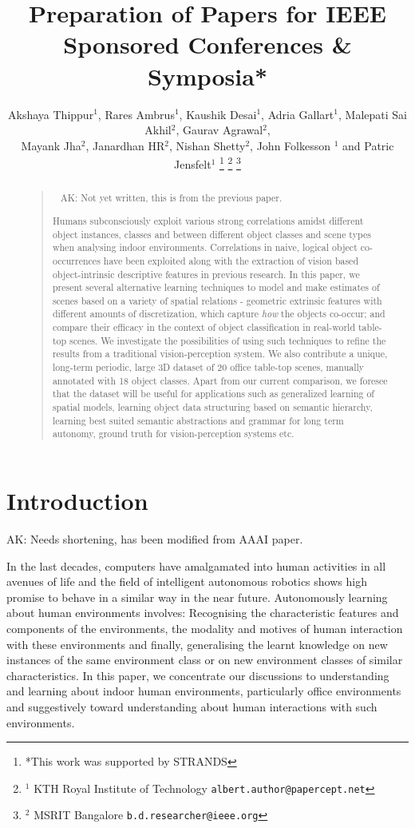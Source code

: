 \documentclass[letterpaper, 10 pt, conference]{ieeeconf}  %
\title{\LARGE \bf
Preparation of Papers for IEEE Sponsored Conferences \& Symposia*
}
\author{Akshaya Thippur$^{1}$, Rares Ambrus$^{1}$, Kaushik Desai$^{1}$, Adria Gallart$^{1}$, Malepati Sai Akhil$^{2}$, Gaurav Agrawal$^{2}$,\\Mayank Jha$^{2}$, Janardhan HR$^{2}$, Nishan Shetty$^{2}$, John Folkesson $^{1}$ and Patric Jensfelt$^{1}$%
\thanks{*This work was supported by STRANDS}%
\thanks{$^{1}$ KTH Royal Institute of Technology
        {\tt\small albert.author@papercept.net}}%
\thanks{$^{2}$ MSRIT Bangalore
        {\tt\small b.d.researcher@ieee.org}}%
}
\begin{document}
\maketitle
\thispagestyle{empty}
\pagestyle{empty}

\begin{abstract}
\begin{quote}\
{\color{blue} AK: Not yet written, this is from the previous paper.}

Humans subconsciously exploit various strong correlations amidst different object instances, classes and between different object classes and scene types when analysing indoor environments. Correlations in naive, logical object co-occurrences have been exploited along with the extraction of vision based object-intrinsic descriptive features in previous research. In this paper, we present several alternative learning techniques to model and make estimates of scenes based on a variety of spatial relations - geometric extrinsic features with different amounts of discretization, which capture \textit{how} the objects co-occur; and compare their efficacy in the context of object classification in real-world table-top scenes. We investigate the possibilities of using such techniques to refine the results from a traditional vision-perception system. We also contribute a unique, long-term periodic, large 3D dataset of 20 office table-top scenes, manually annotated with 18 object classes. Apart from our current comparison, we foresee that the dataset will be useful for applications such as generalized learning of spatial models, learning object data structuring based on semantic hierarchy, learning best suited semantic abstractions and grammar for long term autonomy, ground truth for vision-perception systems etc.

\end{quote}
\end{abstract}


\section{Introduction}
\label{sec:Introduction}

{\color{blue} AK: Needs shortening, has been modified from AAAI paper.}

In the last decades, computers have amalgamated into human activities in all avenues of 
life and the field of intelligent autonomous robotics shows high promise to behave in a 
similar way in the near future. Autonomously learning about human environments involves: 
Recognising the characteristic features and components of the environments, the modality 
and motives of human interaction with these environments and finally, generalising the 
learnt knowledge on new instances of the same environment class or on new environment 
classes of similar characteristics. In this paper, we concentrate our discussions to 
understanding and learning about indoor human environments, particularly office 
environments and suggestively toward understanding about human interactions with such 
environments.
\end{document}
